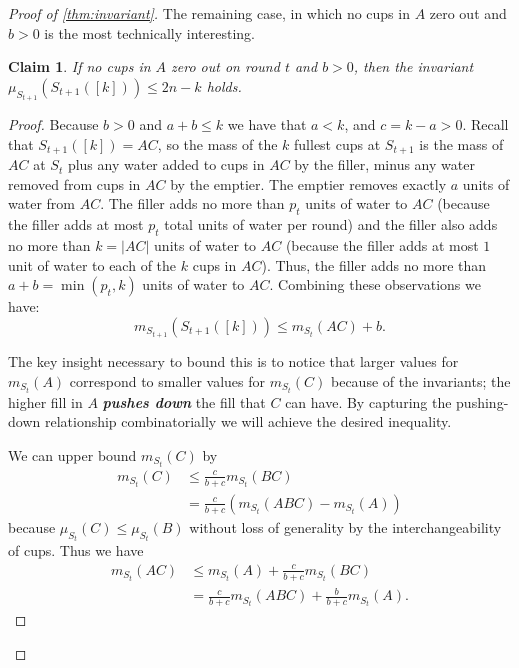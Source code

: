 \documentclass[twocolumn]{article}[10pt]
\newcommand{\defn}[1]{{\textit{\textbf{\boldmath #1}}}\xspace}
\newtheorem{clm}{Claim}
\begin{document}
\begin{proof}[Proof of \cref{thm:invariant}]
The remaining case, in which no cups in $A$ zero out and $b > 0$ is the most technically interesting.
\begin{clm}
  If no cups in $A$ zero out on round $t$ and $b > 0$, then the invariant
  $\mu_{S_{t+1}}(S_{t+1}([k])) \le 2n-k$ holds.
\end{clm}
\begin{proof}
Because $b>0$ and $a+b \le k$ we have that $a
< k$, and $c = k-a > 0$. Recall that $S_{t+1}([k]) = AC$, so the mass of the
$k$ fullest cups at $S_{t+1}$ is the mass of $AC$ at $S_t$ plus any water added
to cups in $AC$ by the filler, minus any water removed from cups in $AC$ by the
emptier. The emptier removes exactly $a$ units of water from $AC$.
The filler adds no more than $p_t$ units of water to $AC$ (because the filler
adds at most $p_t$ total units of water per round) and the filler also
adds no more than $k = |AC|$ units of water to $AC$ (because the filler adds
at most $1$ unit of water to each of the $k$ cups in $AC$).
Thus, the filler adds no more than $a+b = \min(p_t, k)$ units of water to $AC$.
Combining these observations we have:
\begin{equation}
m_{S_{t+1}}(S_{t+1}([k])) \le m_{S_t}(AC) + b.
\label{eq:emptiereptiessomestufffillerfillssomestuff}
\end{equation}

The key insight necessary to bound this is to notice that larger values for
$m_{S_t}(A)$ correspond to smaller values for $m_{S_t}(C)$ because of the
invariants; the higher fill in $A$ \defn{pushes down} the fill that $C$ can
have. By capturing the pushing-down relationship combinatorially we will achieve the desired inequality.

We can upper bound $m_{S_t}(C)$ by 
\begin{align*}
m_{S_t}(C) & \le \frac{c}{b+c}m_{S_t}(BC) \\
&= \frac{c}{b+c}(m_{S_t}(ABC) - m_{S_t}(A))
\end{align*}
 because
$\mu_{S_t}(C) \le \mu_{S_t}(B)$ without loss of generality by the
interchangeability of cups.
Thus we have 
\begin{align}
  m_{S_t}(AC) &\le m_{S_t}(A) + \frac{c}{b+c}m_{S_t}(BC)\label{eqn:BCdiscounted}\\
  &= \frac{c}{b+c}m_{S_t}(ABC) + \frac{b}{b+c}m_{S_t}(A)\label{eqn:redistributeA}.
\end{align}


\end{proof}
\end{proof}
\end{document}
